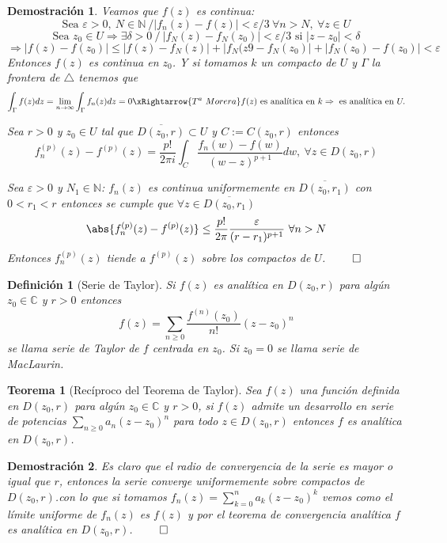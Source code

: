 \documentclass[10pt]{book}
\newtheorem{defi}{Definición}[chapter]
\newtheorem{theorem}{Teorema}[chapter]
\newtheorem*{dem}{Demostración}
\newcommand{\C}{\mathbb{C}}
\newcommand{\N}{\mathbb{N}}
\begin{document}
\begin{dem}
Veamos que $f(z)$ es continua:
$$\text{Sea } \varepsilon >0,\ N \in \N\ / |f_n(z)-f(z)| < \varepsilon/3\ \forall n> N,\ \forall z\in U$$
$$\text{Sea } z_0 \in U \Rightarrow \exists \delta >0\ /\ |f_N(z)-f_N(z_0)|<\varepsilon/3 \text{ si }|z-z_0|<\delta$$
$$ \Rightarrow |f(z)-f(z_0)| \leq |f(z)-f_N(z)|+|f_N(z9-f_N(z_0)|+|f_N(z_0)-f(z_0)|<\varepsilon$$
Entonces $f(z)$ es continua en $z_0$. Y si tomamos $k$ un compacto de $U$ y $\Gamma$ la frontera de $\triangle$ tenemos que
$$\int_\Gamma f(z)dz = \lim_{n\to \infty}\int_\Gamma f_n(z)dz = 0 \xRightarrow{T^a\ Morera} f(z) \text{ es analítica en } k\Rightarrow \text{ es analítica en } U.$$

Sea $r>0$ y $z_0\in U$ tal que $\overline{D(z_0,r)}\subset U$ y $C := C(z_0,r)$ entonces
$$f_n^{(p)}(z) - f^{(p)}(z) = \frac{p!}{2\pi i}\int_C \frac{f_n(w)-f(w)}{(w-z)^{p+1}}dw,\ \forall z\in D(z_0,r)$$

Sea $\varepsilon >0$ y $N_1 \in \N$: $f_n(z)$ es continua uniformemente en $\overline{D(z_0,r_1)}$ con $0<r_1<r$ entonces  se cumple que $\forall z \in\overline{D(z_0,r_1)}$
$$\abs{f_n^{(p)}(z) - f^{(p)}(z)} \leq \frac{p!}{2\pi}\frac{\varepsilon}{(r-r_1)^{p+1}}\ \forall n>N$$
Entonces $f_n^{(p)}(z)$ tiende a $f^{(p)}(z)$ sobre los compactos de $U$. $\qed$
\end{dem}

\begin{defi}[Serie de Taylor]
Si $f(z)$ es analítica en $D(z_0,r)$ para algún $z_0\in\C$ y $r>0$ entonces
$$f(z) = \sum_{n\geq 0} \frac{f^{(n)}(z_0)}{n!}(z-z_0)^n$$
se llama serie de Taylor de $f$ centrada en $z_0$. Si $z_0=0$ se llama serie de MacLaurin. 
\end{defi}


\begin{theorem}[Recíproco del Teorema de Taylor]
Sea $f(z)$ una función definida en $D(z_0,r)$ para algún $z_0\in \C$ y $r>0$, si $f(z)$ admite un desarrollo en serie de potencias $\sum_{n\geq 0} a_n(z-z_0)^n$ para todo $z\in D(z_0,r)$ entonces $f$ es analítica en $D(z_0,r)$.
\end{theorem}

\begin{dem}
Es claro que el radio de convergencia de la serie es mayor o igual que $r$, entonces la serie converge uniformemente sobre compactos de $D(z_0,r)$.con lo que si tomamos $f_n(z) = \sum_{k= 0}^n a_k(z-z_0)^k$ vemos como el límite uniforme de $f_n(z)$ es $f(z)$ y por el teorema de convergencia analítica $f$ es analítica en $D(z_0,r)$. $\qed$
\end{dem}
\end{document}
